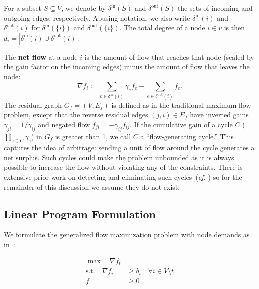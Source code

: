 \documentclass[11pt]{article}
\theoremstyle{definition}
\theoremstyle{definition}
\theoremstyle{definition}
\newcommand{\nfi}{\nabla f_i}
\newcommand{\din}{\delta^{\text{in}}}
\newcommand{\dout}{\delta^{\text{out}}}
\newcommand{\rewrite}[1]{\textcolor{red}{#1}}
\newif\ifLAYOUTA
\begin{document}
	For a subset $S \subseteq V$, we denote by $\din(S)$ and
	$\dout(S)$ the sets of incoming and outgoing edges, respectively. Abusing notation,
    we also write $\din(i)$ and $\dout(i)$ for $\din(\{i\})$ and $\dout(\{i\})$.
	The total degree of a node $i \in v$ is then $d_i = |\din(i) \cup \dout(i)|$.

	The \textbf{net flow} at a node $i$ is the amount of flow that
	reaches that node (scaled by the gain factor on the incoming edges) minus the
	amount of flow that leaves the node:
	$$ \nfi \coloneqq \sum_{e \in \din(i)} \gamma_e f_e - \sum_{e \in \dout(i)} f_e.$$
	The residual graph $G_f = (V,E_f)$ is defined as in the traditional maximum flow problem,
	except that the reverse residual edges $(j,i) \in E_f$ have inverted gains 
	$\gamma_{ji} = 1 / \gamma_{ij}$ and negated flow $f_{ji} =
	-\gamma_{ij}f_{ij}$. If the cumulative gain of a cycle $C$ ($\prod_{e \in C} \gamma_e$)
	in $G_f$ is greater than 1, we call $C$ a ``flow-generating cycle.'' 
	This captures the idea of arbitrage: sending a unit of flow around the cycle
	generates a net surplus. Such cycles could make the problem unbounded as
	it is always possible to increase the flow without violating any of the
	constraints. There is extensive prior work on detecting and eliminating such
	cycles~(\emph{cf.} \cite{Vegh2013})
    so for the remainder of this discussion we assume they do not exist.

	\subsection{Linear Program Formulation}
	\label{sec:lp}

	We formulate the generalized flow maximization problem with node demands as in~\cite{Olver2017}:
	\ifLAYOUTA
	\else
	\vspace{-0.5cm}
	\fi
%
%

	\begin{align*}\tag{P}\label{eqn:primal}
    \max \quad \nabla f_t& \\
    \text{s.t.} \quad
    \nabla f_i &\geq b_i \quad \forall i \in V \setminus t \\
    f &\geq 0
    \end{align*}
\end{document}
